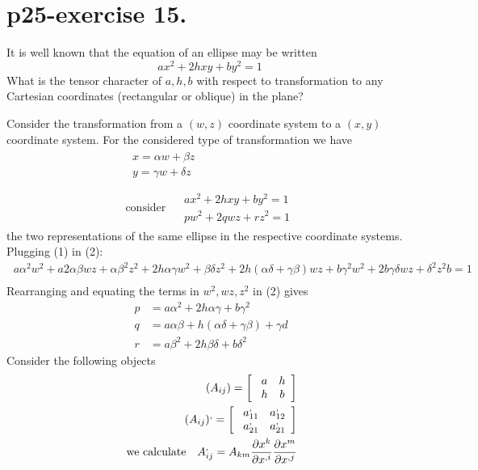 \section{p25-exercise 15.}
\begin{tcolorbox}
It is well known that the equation of an ellipse may be written $$ ax^2+2hxy+by^2 =1$$
What is the tensor character of $a,h, b$ with respect to transformation to any Cartesian coordinates (rectangular or oblique) in the plane?
\end{tcolorbox}
Consider the transformation from a $(w,z)$ coordinate system to a $(x,y)$ coordinate system. For the considered type of transformation we have
\begin {align}
\begin{array}{c}
\ x = \alpha w + \beta z\\
\ y = \gamma w + \delta z\\
  \end{array}\\
\text{consider}\quad \begin{array}{c}
\ ax^2+2hxy+by^2 =1\\
\ pw^2+2qwz+rz^2 =1
  \end{array}
\end{align}
the two representations of the same ellipse in the respective coordinate systems. Plugging (1) in (2):
\begin {align}
\ a\alpha^2 w^2 + a 2 \alpha \beta w z + \alpha \beta^2 z^2 +2h \alpha \gamma w^2 +\beta \delta z^2+2h(\alpha \delta + \gamma \beta) w z + b \gamma^2 w^2 + 2 b \gamma \delta w z +\delta^2 z^2 b = 1\\
\end{align}
Rearranging and equating the terms in $w^2, wz, z^2$ in (2) gives
\begin{align}
\ p &= a \alpha^2 + 2 h \alpha \gamma + b \gamma^2\\
\ q &=  a \alpha \beta + h(\alpha \delta + \gamma \beta) + \gamma d\\
\ r &= a \beta^2 + 2 h \beta \delta +b \delta^2
\end{align}
Consider the following objects
\begin {align}
\ (A_{ij}) = \left[ { \begin{array}{cc}
  \ a &  h\\
  \ h   &b\\
  \end{array}} \right] \\
  \ (A_{ij})^{,} = \left[ { \begin{array}{cc}
  \ a^{,}_{11} &  a^{,}_{12}\\
  \ a^{,}_{21}  & a^{,}_{21}\\
  \end{array}} \right] \\
  \text{ we calculate}\quad A^{,}_{ij} = A_{km}\pdv{x^k}{x^{,i}}\pdv{x^m}{x^{,j}}
\end{align}
